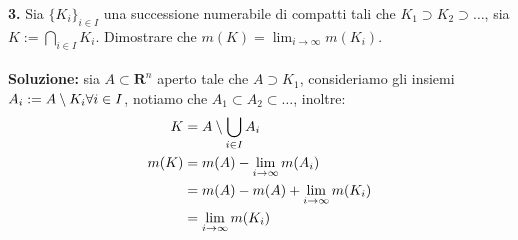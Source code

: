 \documentclass{article}
\begin{document}
\textbf{3.} Sia $\{ K_i \}_{i \in I}$ una successione numerabile di compatti tali che $K_1 \supset K_2 \supset \dots$, sia $K := \bigcap_{i \in I} K_i$. Dimostrare che $m(K) = \lim_{i \rightarrow \infty} m(K_i)$. \\ \\
\textbf{Soluzione:} sia $A \subset \mathbf{R}^n$ aperto tale che $A \supset K_1$, consideriamo gli insiemi $A_i := A \setminus K_i \\ \forall i \in I$, notiamo che $A_1 \subset A_2 \subset \dots$, inoltre:
\begin{align}
    K &= A \setminus \bigcup_{i \in I} A_i \notag \\
    m(K) &= m(A) - \lim_{i \rightarrow \infty} m(A_i) \notag \\
    &= m(A) - m(A) + \lim_{i \rightarrow \infty} m(K_i) \notag \\
    &= \lim_{i \rightarrow \infty} m(K_i) \notag
\end{align} \newpage
\end{document}
